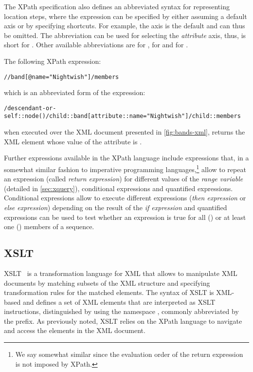 The \ac{XPath} specification also defines an abbreviated syntax for representing location steps, where the expression
can be specified by either assuming a default axis or by specifying shortcuts.  For example, the  axis
is the default and can thus be omitted.
%
The  abbreviation can be used for selecting the \emph{attribute} axis, thus, 
is short for .
%
Other available abbreviations are \character{//} for ,  for
 and  for .  
%


\begin{example}
  The following XPath expression:

  \lstinline{//band[@name="Nightwish"]/members}
  
  \noindent which is an abbreviated form of the expression:

  \lstinline{/descendant-or-self::node()/child::band[attribute::name="Nightwish"]/child::members}
  
  \noindent when executed over the \ac{XML} document presented in \cref{fig:bands-xml}, returns the
   \ac{XML} element whose value of the  attribute is .
\end{example}
%
Further expressions available in the XPath language include \FOR expressions that, in a somewhat similar fashion to
imperative programming languages,\footnote{We say somewhat similar since the evaluation order of the return expression
  is not imposed by XPath.} allow to repeat an expression (called \emph{return expression}) for different values of the
\emph{range variable} (detailed in \cref{sec:xquery}), conditional expressions and quantified expressions.
%
Conditional expressions allow to execute different expressions (\emph{then expression} or \emph{else expression})
depending on the result of the \emph{if expression} and quantified expressions can be used to test whether an expression
is true for all () or at least one () members of a sequence.


\subsection{XSLT}
\label{sec:xslt}

\acf{XSLT}~\cite{Kay:2007aa} is a transformation language for \ac{XML} that allows to manipulate \ac{XML}
documents by matching subsets of the \ac{XML} structure and specifying transformation rules for the matched elements.  
%
The syntax of \ac{XSLT} is \ac{XML}-based and defines a set of \ac{XML} elements that are interpreted as \ac{XSLT}
instructions, distinguished by using the namespace , commonly
abbreviated by the  prefix.
%
As previously noted, \ac{XSLT} relies on the \ac{XPath} language to navigate and access the elements in the
\ac{XML} document.
%

